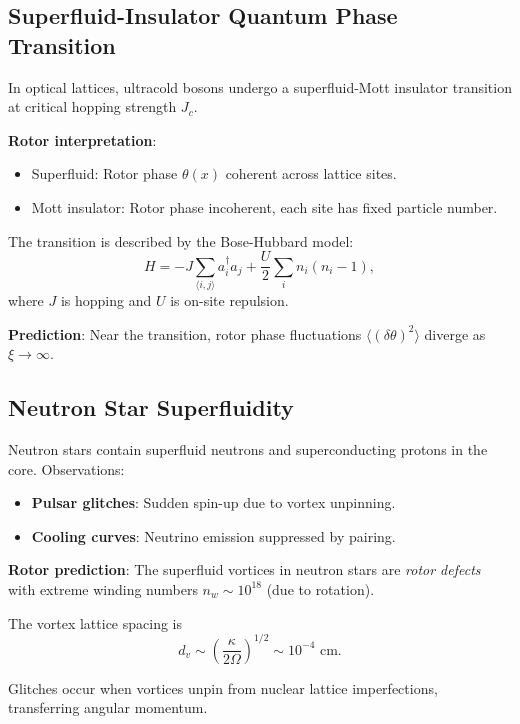 \documentclass[12pt,a4paper]{article}
\theoremstyle{definition}
\theoremstyle{remark}
\begin{document}
\subsection{Superfluid-Insulator Quantum Phase Transition}

In optical lattices, ultracold bosons undergo a superfluid-Mott insulator transition at critical hopping strength $J_c$.

\textbf{Rotor interpretation}:
\begin{itemize}
\item Superfluid: Rotor phase $\theta(x)$ coherent across lattice sites.
\item Mott insulator: Rotor phase incoherent, each site has fixed particle number.
\end{itemize}

The transition is described by the Bose-Hubbard model:
\begin{equation}
H = -J \sum_{\langle i,j \rangle} a_i^\dagger a_j + \frac{U}{2} \sum_i n_i(n_i - 1),
\end{equation}
where $J$ is hopping and $U$ is on-site repulsion.

\textbf{Prediction}: Near the transition, rotor phase fluctuations $\langle (\delta \theta)^2 \rangle$ diverge as $\xi \to \infty$.

\subsection{Neutron Star Superfluidity}

Neutron stars contain superfluid neutrons and superconducting protons in the core. Observations:
\begin{itemize}
\item \textbf{Pulsar glitches}: Sudden spin-up due to vortex unpinning.
\item \textbf{Cooling curves}: Neutrino emission suppressed by pairing.
\end{itemize}

\textbf{Rotor prediction}: The superfluid vortices in neutron stars are \emph{rotor defects} with extreme winding numbers $n_w \sim 10^{18}$ (due to rotation).

The vortex lattice spacing is
\begin{equation}
d_v \sim \left(\frac{\kappa}{2\Omega}\right)^{1/2} \sim 10^{-4} \text{ cm}.
\end{equation}

Glitches occur when vortices unpin from nuclear lattice imperfections, transferring angular momentum.
\end{document}
